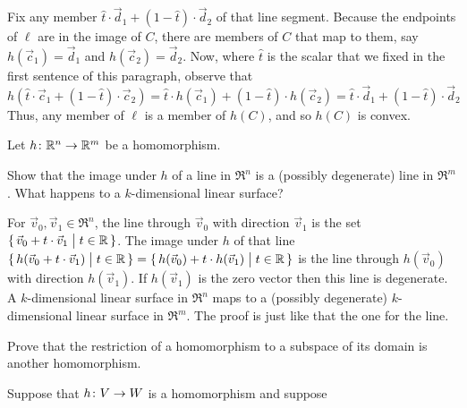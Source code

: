 \begin{exercises}
\begin{answer}
\begin{exparts}
          Fix any member $\hat{t}\cdot\vec{d}_1+(1-\hat{t})\cdot\vec{d}_2$
          of that line segment.
          Because the endpoints of $\ell$ are in the image of $C$, there are
          members of $C$ that map to them, say $h(\vec{c}_1)=\vec{d}_1$
          and $h(\vec{c}_2)=\vec{d}_2$.
          Now, where $\hat{t}$ is the scalar that we fixed in the first
          sentence of this paragraph, observe that
          $h(\hat{t}\cdot\vec{c}_1+(1-\hat{t})\cdot\vec{c}_2)
          =\hat{t}\cdot h(\vec{c}_1)+(1-\hat{t})\cdot h(\vec{c}_2)
          =\hat{t}\cdot\vec{d}_1+(1-\hat{t})\cdot\vec{d}_2$
          Thus, any member of $\ell$ is a member of $h(C)$, and so $h(C)$ is
          convex.
      \end{exparts}
    \end{answer}
  \recommended \item \label{exer:HomosPresLinStruc}
    Let \( \mbox{$h\colon \mathbb{R}^n\to \mathbb{R}^m$} \) be a homomorphism.
    \begin{exparts}
      \partsitem Show that the image under \( h \) of a line in 
        \( \Re^n \) is a (possibly degenerate) line in \( \Re^m \).
      \partsitem What happens to a \( k \)-dimensional linear surface?
    \end{exparts}
    \begin{answer}
      \begin{exparts}
        \partsitem For \( \vec{v}_0,\vec{v}_1\in\Re^n \), the line through 
          \( \vec{v}_0 \) with direction \( \vec{v}_1 \) is the set 
          $\mbox{$\{\,\vec{v}_0+t\cdot \vec{v}_1\bigm| t\in\mathbb{R}\,\}$}$.
          The image under $h$ of that line
          $\mbox{$\{\,h(\vec{v}_0+t\cdot \vec{v}_1)\bigm| t\in\mathbb{R}\,\}$}
             =\mbox{$\{\,h(\vec{v}_0)+t\cdot h(\vec{v}_1)\bigm| t\in\mathbb{R}\,\}$}$
          is the line through $h(\vec{v}_0)$ with direction $h(\vec{v}_1)$.
          If \( h(\vec{v}_1) \) is the zero vector then this line is 
          degenerate.
        \partsitem A \( k \)-dimensional linear surface in \( \Re^n \) maps to
          a (possibly degenerate) \( k \)-dimensional linear surface in
          \( \Re^m \).
          The proof is just like that the one for the line.
      \end{exparts}  
     \end{answer}
  \item 
    Prove that the restriction of a homomorphism to a subspace of its
    domain is another homomorphism.
    \begin{answer}
      Suppose that \( \mbox{$h\colon V\to W$} \) is a homomorphism and suppose

\end{answer}
\end{exercises}
